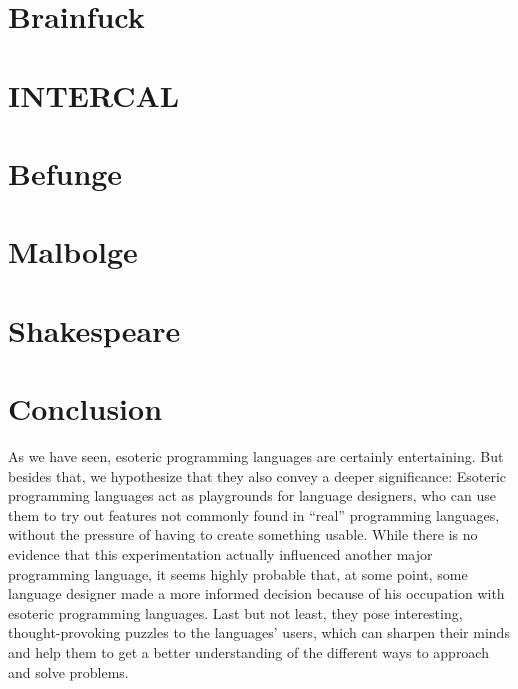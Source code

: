 \documentclass{sig-alternate}
\begin{document}
\section{Brainfuck}


\section{INTERCAL}


\section{Befunge}


\section{Malbolge}


\section{Shakespeare}


\section{Conclusion}

As we have seen, esoteric programming languages are certainly entertaining. But besides that, we hypothesize that they also convey a deeper significance:
Esoteric programming languages act as playgrounds for language designers, who can use them to try out features not commonly found in “real” programming languages, without the pressure of having to create something usable. While there is no evidence that this experimentation actually influenced another major programming language, it seems highly probable that, at some point, some language designer made a more informed decision because of his occupation with esoteric programming languages.
Last but not least, they pose interesting, thought-provoking puzzles to the languages' users, which can sharpen their minds and help them to get a better understanding of the different ways to approach and solve problems.

\printbibliography[prenote=prenote]
\end{document}
